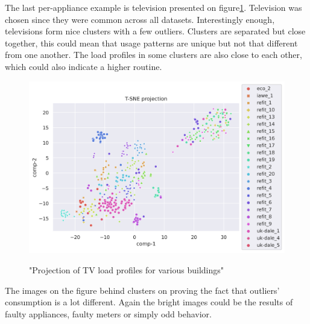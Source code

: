 The last per-appliance example is television presented on figure\ref{fig:tsne_pa_scatter_all_tv}. 
Television was chosen since they were common across all datasets.
Interestingly enough, televisions form nice clusters with a few outliers.
Clusters are separated but close together, this could mean that usage patterns are unique
but not that different from one another. 
The load profiles in some clusters are also close to each other, which could also indicate 
a higher routine.

\begin{figure}[H]
	\centering
	\caption{"Projection of TV load profiles for various buildings"}
	\includegraphics[width=1.2\textwidth]{Figures/TSNE/TSNE_per_appliance/all/scatter_all_television.png}
	\label{fig:tsne_pa_scatter_all_tv}
\end{figure}

The images on the figure behind clusters on proving the fact that outliers' consumption is a lot different.
Again the bright images could be the results of faulty appliances, faulty meters or simply odd behavior.

